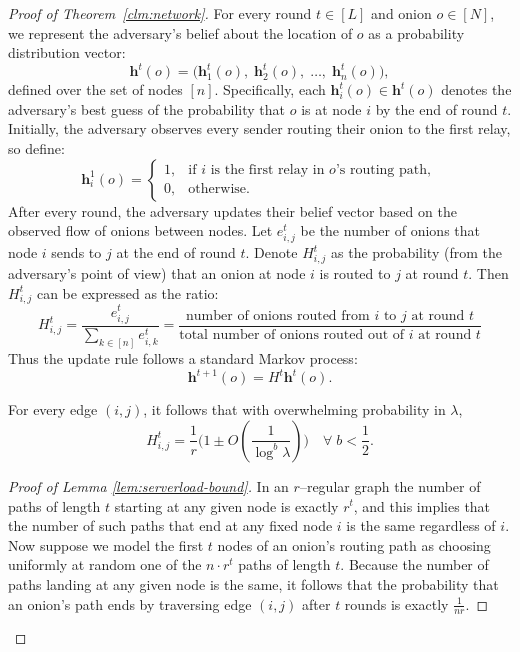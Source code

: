 \begin{proof} [Proof of Theorem~\ref{clm:network}]

For every round $t \in [L]$ and onion $o \in [N]$, we represent the adversary’s belief about the location of $o$ as a probability distribution vector:
$$
\mathbf{h}^t(o) = \Big(\mathbf{h}^t_1(o), \; \mathbf{h}^t_2(o), \; \dots, \; \mathbf{h}^t_n(o)\Big),
$$
defined over the set of nodes $[n]$. Specifically, each $\mathbf{h}^t_i(o) \in \mathbf{h}^t(o)$ denotes the adversary's best guess of the probability that $o$ is at node $i$ by the end of round $t$. Initially, the adversary observes every sender routing their onion to the first relay, so define:
$$
\mathbf{h}^1_i(o) =
\begin{cases}
    1, & \text{if $i$ is the first relay in $o$'s routing path},\\
    0, & \text{otherwise.}
\end{cases}
$$
After every round, the adversary updates their belief vector based on the observed flow of onions between nodes. Let $e^t_{i,j}$ be the number of onions that node $i$ sends to $j$ at the end of round $t$. Denote $H^t_{i,j}$ as the probability (from the adversary's point of view) that an onion at node $i$ is routed to $j$ at round $t$. Then $H^t_{i,j}$ can be expressed as the ratio:
$$
H^t_{i,j} = \frac{e^t_{i,j}}{\sum_{k \in [n]} e^t_{i,k}} = \frac{\text{number of onions routed from $i$ to $j$ at round $t$}}{\text{total number of onions routed out of $i$ at round $t$}}
$$
Thus the update rule follows a standard Markov process:
$$
\mathbf{h}^{t+1}(o) = H^t \mathbf{h}^{t}(o).
$$


\begin{lemma} \label{lem:serverload-bound}
    For every edge $(i,j)$, it follows that with overwhelming probability in $\lambda$, 
    $$
    H^t_{i,j} = \frac{1}{r} \Big(1 \pm O(\frac{1}{\log^{b} \lambda})\Big) \quad \forall \; b < \frac{1}{2}.
    $$
\end{lemma}
\begin{proof}[Proof of Lemma \ref{lem:serverload-bound}]
In an $r$–regular graph the number of paths of length $t$ starting at any given node is exactly $r^t$, and this implies that the number of such paths that end at any fixed node $i$ is the same regardless of $i$. 
Now suppose we model the first $t$ nodes of an onion's routing path as choosing uniformly at random one of the $n \cdot r^t$ paths of length $t$. Because the number of paths landing at any given node is the same, it follows that the probability that an onion's path ends by traversing edge $(i,j)$ after $t$ rounds is exactly $\frac{1}{nr}$.


\end{proof}
\end{proof}
